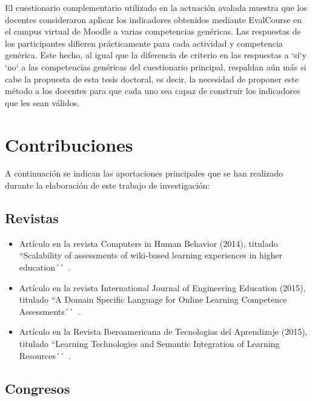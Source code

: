 El cuestionario complementario utilizado en la actuación avalada muestra que los docentes consideraron aplicar los indicadores obtenidos mediante EvalCourse en el campus virtual de Moodle a varias competencias genéricas. Las respuestas de los participantes difieren prácticamente para cada actividad y competencia genérica. Este hecho, al igual que la diferencia de criterio en las respuestas a `sí`y `no` a las competencias genéricas del cuestionario principal, respaldan aún más si cabe la propuesta de esta tesis doctoral, es decir, la necesidad de proponer este método a los docentes para que cada uno sea capaz de construir los indicadores que les sean válidos.

\section{Contribuciones} \label{eva:contribuciones}

	A continuación se indican las aportaciones principales que se han realizado durante la elaboración de este trabajo de investigación:

	\subsection*{Revistas}

	\begin{itemize}
	\item Artículo en la revista Computers in Human Behavior (2014), titulado ``Scalability of assessments of wiki-based learning experiences in higher education´´~\cite{palomo2014scalability}.
	\item Artículo en la revista International Journal of Engineering Education (2015), titulado ``A Domain Specific Language for Online Learning Competence Assessments´´~\cite{Balderas:2015}.
	\item Artículo en la Revista Iberoamericana de Tecnologias del Aprendizaje (2015), titulado ``Learning Technologies and Semantic Integration of Learning Resources´´~\cite{dodero2015learning}.
	\end{itemize}

	\subsection*{Congresos}

